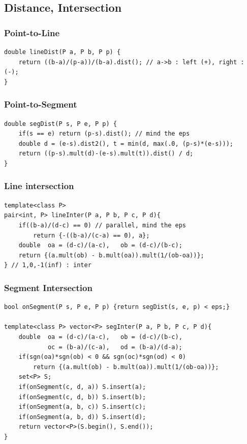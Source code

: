 \documentclass[landscape, 8pt, a4paper, oneside, twocolumn]{extarticle}
\begin{document}
\subsection{Distance, Intersection}
\subsubsection{Point-to-Line}
\begin{verbatim}
double lineDist(P a, P b, P p) {
    return ((b-a)/(p-a))/(b-a).dist(); // a->b : left (+), right : (-);
}
\end{verbatim}
\subsubsection{Point-to-Segment}
\begin{verbatim}
double segDist(P s, P e, P p) {
    if(s == e) return (p-s).dist(); // mind the eps
    double d = (e-s).dist2(), t = min(d, max(.0, (p-s)*(e-s)));
    return ((p-s).mult(d)-(e-s).mult(t)).dist() / d;
}
\end{verbatim}
\subsubsection{Line intersection}
\begin{verbatim}
template<class P>
pair<int, P> lineInter(P a, P b, P c, P d){
    if((b-a)/(d-c) == 0) // parallel, mind the eps
        return {-((b-a)/(c-a) == 0), a};
    double  oa = (d-c)/(a-c),   ob = (d-c)/(b-c);
    return {(a.mult(ob) - b.mult(oa)).mult(1/(ob-oa))};
} // 1,0,-1(inf) : inter
\end{verbatim}
\subsubsection{Segment Intersection}
\begin{verbatim}
bool onSegment(P s, P e, P p) {return segDist(s, e, p) < eps;}

template<class P> vector<P> segInter(P a, P b, P c, P d){
    double  oa = (d-c)/(a-c),   ob = (d-c)/(b-c),
            oc = (b-a)/(c-a),   od = (b-a)/(d-a);
    if(sgn(oa)*sgn(ob) < 0 && sgn(oc)*sgn(od) < 0)
        return {(a.mult(ob) - b.mult(oa)).mult(1/(ob-oa))};
    set<P> S;
    if(onSegment(c, d, a)) S.insert(a);
    if(onSegment(c, d, b)) S.insert(b);
    if(onSegment(a, b, c)) S.insert(c);
    if(onSegment(a, b, d)) S.insert(d);
    return vector<P>(S.begin(), S.end());
}
\end{verbatim}
\end{document}
